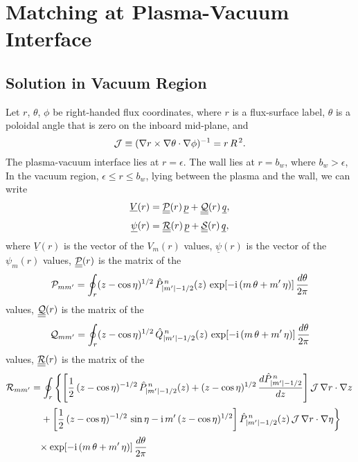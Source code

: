 \documentclass[12pt,prb,aps,notitlepage]{revtex4-1}
\begin{document}
\section{Matching at Plasma-Vacuum Interface}
\subsection{Solution in Vacuum Region}
Let $r$, $\theta$, $\phi$ be right-handed flux coordinates, where $r$ is a flux-surface label,  $\theta$ is a poloidal angle that is zero on the inboard mid-plane, and
\begin{equation}
{\cal J} \equiv (\nabla r\times\nabla\theta\cdot\nabla\phi)^{-1}= r\,R^{\,2}.
\end{equation}
The plasma-vacuum interface lies at $r=\epsilon$. The wall lies at $r=b_w$, where $b_w>\epsilon$,  In the
vacuum region, $\epsilon\leq r\leq b_w$,  lying between the plasma and the wall, we can write
\begin{align}\label{e32a}
\underline{V}(r)&= \underline{\underline{{\cal P}}}(r)\,\underline{p}+ \underline{\underline{{\cal Q}}}(r)\,\underline{q},\\[0.5ex]
\underline{\psi}(r)&= \underline{\underline{{\cal R}}}(r)\,\underline{p}+ \underline{\underline{{\cal S}}}(r)\,\underline{q},\label{e33a}
\end{align}
where $\underline{V}(r)$ is the vector of the $V_m(r)$ values, $\underline{\psi}(r)$ is the vector of the $\psi_m(r)$ values, $\underline{\underline{{\cal P}}}(r)$ is the
matrix of the
\begin{equation}
{\cal P}_{mm'}=\oint_{r}(z-\cos\eta)^{1/2}\,\hat{P}_{|m'|-1/2}^{\,n}(z)\,\exp[-{\rm i}\,(m\,\theta+m'\,\eta)]\,\frac{d\theta}{2\pi}
\end{equation}
values, 
$\underline{\underline{{\cal Q}}}(r)$ is the
matrix of the
\begin{equation}
{\cal Q}_{mm'}=\oint_{r}(z-\cos\eta)^{1/2}\,\hat{Q}_{|m'|-1/2}^{\,n}(z)\,\exp[-{\rm i}\,(m\,\theta+m'\,\eta)]\,\frac{d\theta}{2\pi}
\end{equation}
values, $\underline{\underline{{\cal R}}}(r)$ is the matrix of the 
\begin{align}\label{e354}
{\cal R}_{mm'} &=\oint_{r}
\left\{\left[\frac{1}{2}\,(z-\cos\eta)^{-1/2}\,\hat{P}_{|m'|-1/2}^{\,n}(z)+(z-\cos\eta)^{1/2}\,\frac{d\hat{P}_{|m'|-1/2}^{\,n}}{dz}\right]{\cal J}\,\nabla r\cdot \nabla z
\right.\nonumber\\[0.5ex]&
\left.\phantom{=}+\left[\frac{1}{2}\,(z-\cos\eta)^{-1/2}\,\sin\eta-{\rm i}\,m'\,(z-\cos\eta)^{1/2}\right]\hat{P}_{|m'|-1/2}^{\,n}(z)\,{\cal J}\,\nabla r\cdot \nabla \eta
\right\}\nonumber\\[0.5ex] &
\phantom{=}\times\exp[-{\rm i}\,(m\,\theta+m'\,\eta)]\,\frac{d\theta}{2\pi}
\end{align}
\end{document}
